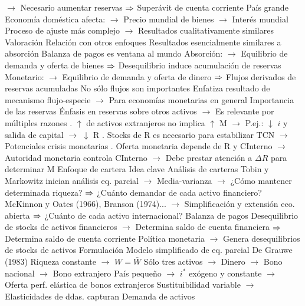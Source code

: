 \documentclass{nuevotema}
\begin{document}
\begin{esquemal}
				\4[] $\to$ Necesario aumentar reservas
				\4[] $\Rightarrow$ Superávit de cuenta corriente
				\4 País grande
				\4[] Economía doméstica afecta:
				\4[] $\to$ Precio mundial de bienes
				\4[] $\to$ Interés mundial
				\4[] Proceso de ajuste más complejo
				\4[] $\to$ Resultados cualitativamente similares
			\3 Valoración
				\4 Relación con otros enfoques
				\4[] Resultados esencialmente similares a absorción
				\4[] Balanza de pagos es ventana al mundo
				\4[] Absorción:
				\4[] $\to$ Equilibrio de demanda y oferta de bienes
				\4[] $\Rightarrow$ Desequilibrio induce acumulación de reservas
				\4[] Monetario:
				\4[] $\to$ Equilibrio de demanda y oferta de dinero
				\4[] $\Rightarrow$ Flujos derivados de reservas acumuladas
				\4 No sólo flujos son importantes
				\4[] Enfatiza resultado de mecanismo flujo-especie
				\4[] $\to$ Para economías monetarias en general
				\4 Importancia de las reservas
				\4[] Énfasis en reservas sobre otros activos
				\4[] $\to$ Es relevante por múltiples razones
				. $\uparrow$ de activos extranjeros no implica $\uparrow$ M
				\4[] $\to$ P.ej.: $\downarrow$ $i$ y salida de capital $\to$ $\downarrow$ R
				. Stocks de R es necesario para estabilizar TCN
				\4[] $\to$ Potenciales crisis monetarias
				. Oferta monetaria depende de R y CInterno
				\4[] $\to$ Autoridad monetaria controla CInterno
				\4[] $\to$ Debe prestar atención a $\Delta R$ para determinar M
		\2 Enfoque de cartera
			\3 Idea clave
				\4 Análisis de carteras
				\4[] Tobin y Markowitz inician análisis eq. parcial
				\4[] $\to$ Media-varianza
				\4[] $\to$ ¿Cómo mantener determinada riqueza?
				\4[] $\Rightarrow$ ¿Cuánto demandar de cada activo financiero?
				\4[] McKinnon y Oates (1966), Branson (1974)...
				\4[] $\to$ Simplificación y extensión eco. abierta
				\4[] $\Rightarrow$ ¿Cuánto de cada activo internacional?
				\4 Balanza de pagos
				\4[] Desequilibrio de stocks de activos financieros
				\4[] $\to$ Determina saldo de cuenta financiera
				\4[] $\Rightarrow$ Determina saldo de cuenta corriente
				\4[] Política monetaria
				\4[] $\to$ Genera desequilibrios de stocks de activos
			\3 Formulación
				\4 Modelo simplificado de eq. parcial
				\4[] De Grauwe (1983)
				\4[] Riqueza constante
				\4[] $\to$ $W = \bar{W}$
				\4[] Sólo tres activos
				\4[] $\to$ Dinero
				\4[] $\to$ Bono nacional
				\4[] $\to$ Bono extranjero
				\4[] País pequeño
				\4[] $\to$ $i^*$ exógeno y constante
				\4[] $\to$ Oferta perf. elástica de bonos extranjeros
				\4[] Sustituibilidad variable
				\4[] $\to$ Elasticidades de ddas. capturan
				\4 Demanda de activos

\end{esquemal}
\end{document}

